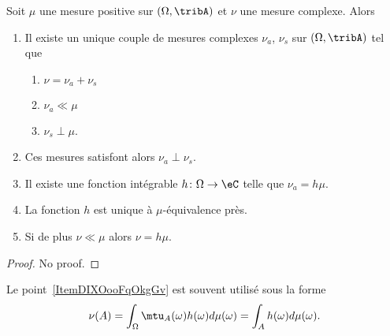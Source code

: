 \begin{theorem}\label{ThoZZMGooKhRYaO}
    Soit \( \mu\) une mesure positive sur \( (\Omega,\tribA)\) et \( \nu\) une mesure complexe. Alors
    \begin{enumerate}
        \item
            Il existe un unique couple de mesures complexes \( \nu_a\), \( \nu_s\) sur \( (\Omega,\tribA)\) tel que
            \begin{enumerate}
                \item
                    \( \nu=\nu_a+\nu_s\)
                \item
                    \( \nu_a\ll\mu\)
                \item
                    \( \nu_s\perp \mu\).
            \end{enumerate}
        \item
            Ces mesures satisfont alors \( \nu_a\perp\nu_s\).
        \item
            Il existe une fonction intégrable \( h\colon \Omega\to \eC\) telle que \( \nu_a=h\mu\).
        \item
            La fonction \( h\) est unique à \( \mu\)-équivalence près.
        \item   \label{ItemDIXOooFqOkgGv}
            Si de plus \( \nu\ll \mu\) alors \( \nu=h\mu\).
    \end{enumerate}
\end{theorem}
\begin{proof}
    No proof.
\end{proof}

\begin{remark}  \label{RemSYRMooZPBhbQ}
    Le point~\ref{ItemDIXOooFqOkgGv} est souvent utilisé sous la forme
    \begin{equation}
        \nu(A)=\int_{\Omega}\mtu_A(\omega)h(\omega)d\mu(\omega)=\int_{A}h(\omega)d\mu(\omega).
    \end{equation}
\end{remark}

